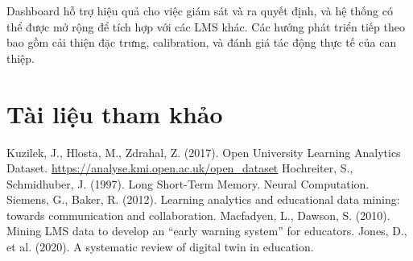 \documentclass[12pt,a4paper]{article}
\begin{document}
Dashboard hỗ trợ hiệu quả cho việc giám sát và ra quyết định, và hệ thống có thể được mở rộng để tích hợp với các LMS khác. Các hướng phát triển tiếp theo bao gồm cải thiện đặc trưng, calibration, và đánh giá tác động thực tế của can thiệp.

\section*{Tài liệu tham khảo}
\begin{thebibliography}{9}
 Kuzilek, J., Hlosta, M., Zdrahal, Z. (2017). Open University Learning Analytics Dataset. \url{https://analyse.kmi.open.ac.uk/open_dataset}
 Hochreiter, S., Schmidhuber, J. (1997). Long Short-Term Memory. Neural Computation.
 Siemens, G., Baker, R. (2012). Learning analytics and educational data mining: towards communication and collaboration.
 Macfadyen, L., Dawson, S. (2010). Mining LMS data to develop an ``early warning system'' for educators.
 Jones, D., et al. (2020). A systematic review of digital twin in education.
\end{thebibliography}
\end{document}

